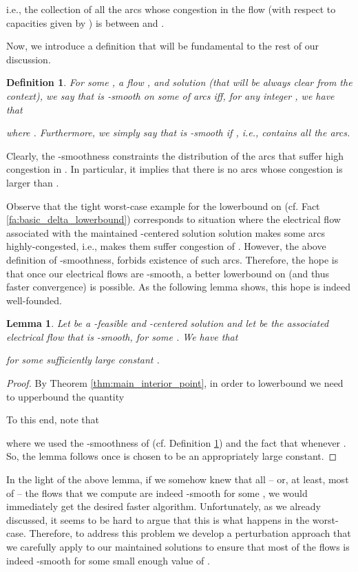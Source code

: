 \documentclass[11pt, letterpaper]{article}
\newtheorem{lemma}[theorem]{Lemma}
\newtheorem{definition}[theorem]{Definition}
\begin{document}
i.e., the collection of all the arcs whose congestion in the flow  (with respect to capacities given by ) is between  and .


Now, we introduce a definition that will be fundamental to the rest of our discussion.
\begin{definition}
\label{def:smoothness}
For some , a flow , and solution  (that will be always clear from the context), we say that  is {\em -smooth on some of arcs } iff, for any integer , we have that

where . 
Furthermore, we simply say that  is {\em -smooth} if , i.e.,  contains all the arcs. 
\end{definition} 
Clearly, the -smoothness constraints the distribution of the arcs that suffer high congestion in . In particular, it implies that there is no arcs whose congestion  is larger than . 

Observe that the tight worst-case example for the lowerbound on  (cf. Fact \ref{fa:basic_delta_lowerbound}) corresponds to situation where the electrical flow  associated with the maintained -centered solution solution  makes some arcs highly-congested, i.e., makes them suffer congestion of . However, the above definition of -smoothness, forbids existence of such arcs. Therefore, the hope is that once our electrical flows  are -smooth, a better lowerbound on  (and thus faster convergence) is possible. As the following lemma shows, this hope is indeed well-founded.

\begin{lemma}
\label{lem:better_delta_lowerbound}
Let  be a -feasible and -centered solution and let  be the associated electrical flow that is -smooth, for some . We have that

for some sufficiently large constant .
\end{lemma}

\begin{proof}
By Theorem \ref{thm:main_interior_point}, in order to lowerbound  we need to upperbound the quantity
 

To this end, note that 

where we used the -smoothness of  (cf. Definition \ref{def:smoothness}) and the fact that  whenever . So, the lemma follows once  is chosen to be an appropriately large constant.
\end{proof}


In the light of the above lemma, if we somehow knew that all -- or, at least, most of -- the flows  that we compute are indeed -smooth for some  , we would immediately get the desired faster algorithm. Unfortunately, as we already discussed, it seems to be hard to argue that this is what happens in the worst-case.  Therefore, to address this problem we develop a perturbation approach that we carefully apply to our maintained solutions to ensure that most of the flows  is indeed -smooth for some small enough value of . 
\end{document}

